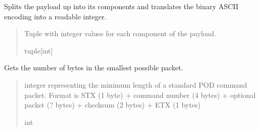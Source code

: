 \documentclass[letterpaper,10pt,english]{sphinxmanual}
\begin{document}
\begin{fulllineitems}
\begin{fulllineitems}
\end{fulllineitems}


\begin{fulllineitems}
\label{\detokenize{Morelia.Packets:Morelia.Packets.Standard.PacketStandard.DefaultPayload}}
\pysigstartsignatures
{}
\pysigstopsignatures
\sphinxAtStartPar
Splits the payload up into its components and translates the binary ASCII encoding         into a readable integer.
\begin{quote}\begin{description}
\sphinxAtStartPar
Tuple with integer values for each component of the payload.

\sphinxAtStartPar
tuple{[}int{]}

\end{description}\end{quote}

\end{fulllineitems}


\begin{fulllineitems}
\label{\detokenize{Morelia.Packets:Morelia.Packets.Standard.PacketStandard.GetMinimumLength}}
\pysigstartsignatures
{}
\pysigstopsignatures
\sphinxAtStartPar
Gets the number of bytes in the smallest possible packet.
\begin{quote}\begin{description}
\sphinxAtStartPar
integer representing the minimum length of a standard                 POD command packet. Format is STX (1 byte) + command number (4 bytes)                 + optional packet (? bytes) + checksum (2 bytes) + ETX (1 bytes)

\sphinxAtStartPar
int

\end{description}\end{quote}


\end{fulllineitems}
\end{fulllineitems}
\end{document}
